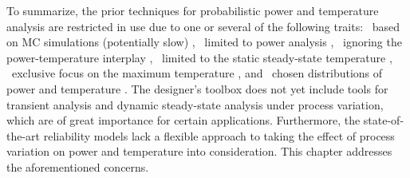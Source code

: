 To summarize, the prior techniques for probabilistic power and temperature
analysis are restricted in use due to one or several of the following traits:
\one~based on \ac{MC} simulations (potentially slow) \cite{chandra2010},
\two~limited to power analysis \cite{bhardwaj2006, ghanta2006, vrudhula2006,
bhardwaj2008, shen2009, chandra2010}, \three~ignoring the power-temperature
interplay \cite{bhardwaj2006, ghanta2006, vrudhula2006, bhardwaj2008,
huang2009a, shen2009}, \four~limited to the static steady-state temperature
\cite{huang2009a, juan2011, juan2012, lee2013}, \five~exclusive focus on the
maximum temperature \cite{juan2011}, and \six~\apriori chosen distributions of
power and temperature \cite{bhardwaj2006, srivastava2010, juan2012}. The
designer's toolbox does not yet include tools for transient analysis and dynamic
steady-state analysis under process variation, which are of great importance for
certain applications. Furthermore, the state-of-the-art reliability models lack
a flexible approach to taking the effect of process variation on power and
temperature into consideration. This chapter addresses the aforementioned
concerns.
